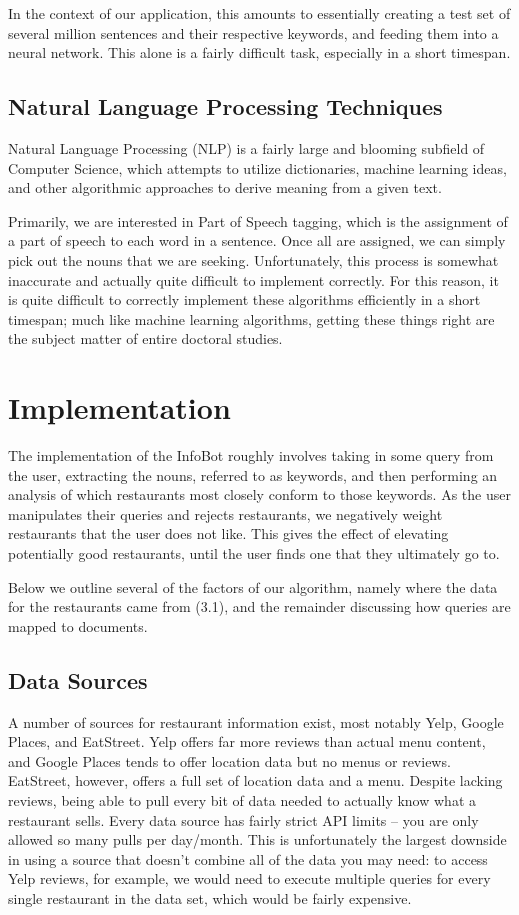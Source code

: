 \documentclass{article}
\begin{document}
        In the context of our application, this amounts to essentially creating a test set of several million sentences and their respective keywords, and 
feeding them into a neural network. This alone is a fairly difficult task, especially in a short timespan.
        
    \subsection{Natural Language Processing Techniques}
        Natural Language Processing (NLP) is a fairly large and blooming subfield of Computer Science, which attempts to utilize dictionaries, machine learning 
ideas, and other algorithmic approaches to derive meaning from a given text.
        
        Primarily, we are interested in Part of Speech tagging, which is the assignment of a part of speech to each word in a sentence. Once all are assigned, 
we can simply pick out the nouns that we are seeking. Unfortunately, this process is somewhat inaccurate and actually quite difficult to implement 
correctly\cite{postagging}. For this reason, it is quite difficult to correctly implement these algorithms efficiently in a short timespan; much like machine 
learning algorithms, getting these things right are the subject matter of entire doctoral studies.

\section{Implementation}
    The implementation of the InfoBot roughly involves taking in some query from the user, extracting the nouns, referred to as keywords, and then performing an 
analysis of which restaurants most closely conform to those keywords. As the user manipulates their queries and rejects restaurants, we negatively weight 
restaurants that the user does not like. This gives the effect of elevating potentially good restaurants, until the user finds one that they ultimately go to.
    
    Below we outline several of the factors of our algorithm, namely where the data for the restaurants came from (3.1), and the remainder discussing how 
queries are mapped to documents.
    
    \subsection{Data Sources}
        A number of sources for restaurant information exist, most notably Yelp, Google Places, and EatStreet. Yelp offers far more reviews than actual menu 
content, and Google Places tends to offer location data but no menus or reviews. EatStreet, however, offers a full set of location data and a menu. Despite 
lacking reviews, being able to pull every bit of data needed to actually know what a restaurant sells. Every data source has fairly strict API limits -- you are 
only allowed so many pulls per day/month. This is unfortunately the largest downside in using a source that doesn't combine all of the data you may need: to 
access Yelp reviews, for example, we would need to execute multiple queries for every single restaurant in the data set, which would be fairly expensive.
        
\end{document}
